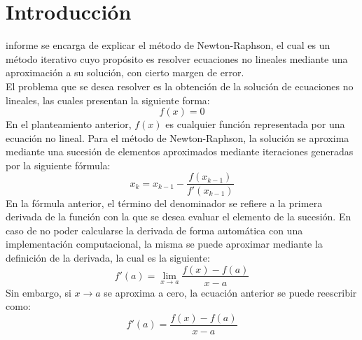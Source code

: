 \documentclass[journal]{IEEEtran}
\begin{document}
\section{Introducción}
% 
% 
% 
% 
 informe se encarga de explicar el método de Newton-Raphson, el cual es un método iterativo cuyo propósito es resolver ecuaciones no lineales mediante una aproximación a su solución, con cierto margen de error.\\
\indent El problema que se desea resolver es la obtención de la solución de ecuaciones no lineales, las cuales presentan la siguiente forma:
\begin{equation}
f(x) = 0
\label{eq:func}
\end{equation}
\indent En el planteamiento anterior, \(f(x)\) es cualquier función representada por una ecuación no lineal. Para el método de Newton-Raphson, la solución se aproxima mediante una sucesión de elementos aproximados mediante iteraciones generadas por la siguiente fórmula:
\begin{equation}
x_{k} = x_{k - 1} - \frac{f(x_{k - 1})}{f'(x_{k - 1})}
\label{eq: metodoNR}
\end{equation}
\indent En la fórmula anterior, el término del denominador se refiere a la primera derivada de la función con la que se desea evaluar el elemento de la sucesión. En caso de no poder calcularse la derivada de forma automática con una implementación computacional, la misma se puede aproximar mediante la definición de la derivada, la cual es la siguiente:
\begin{equation}
f'(a) =  \lim_{x\to a} \frac{f(x) - f(a)}{x - a}
\label{eq:aproxDerivada}
\end{equation}
\indent Sin embargo, si \(x\to a \) se aproxima a cero, la ecuación anterior se puede reescribir como:
\begin{equation}
f'(a) =  \frac{f(x) - f(a)}{x - a}
\label{eq:aproxDerivada2}
\end{equation}
\end{document}
